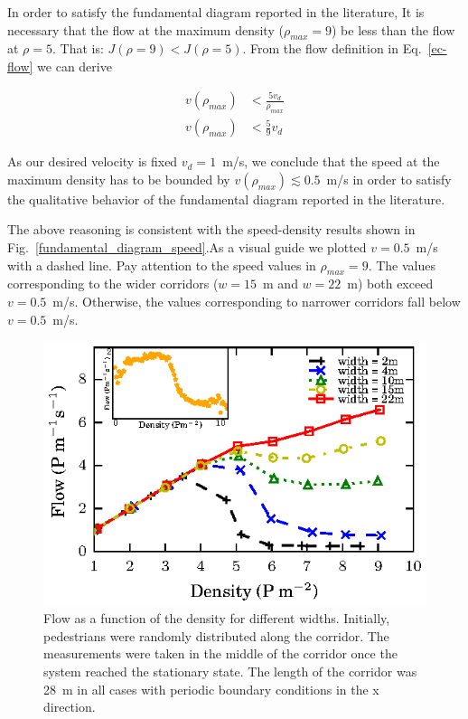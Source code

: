 In order to satisfy the fundamental diagram reported in the literature, It is necessary that the flow at the maximum density ($\rho_{max} = 9$) be less than the flow at $\rho = 5$. That is:  $J(\rho = 9) < J(\rho = 5)$. From the flow definition in Eq.~\ref{ec-flow} we can derive

\begin{align*} 
v(\rho_{max}) &< \frac{5v_d}{\rho_{max}} \\
v(\rho_{max}) &< \frac{5}{9} v_d
\end{align*}

As our desired velocity is fixed $v_d = 1$~m/s, we conclude that the speed at the maximum density has to be bounded by $v(\rho_{max}) \lesssim  0.5$~m/s in order to satisfy the qualitative behavior of the fundamental diagram reported in the literature.

The above reasoning is consistent with the speed-density results shown in Fig.~\ref{fundamental_diagram_speed}.As a visual guide we plotted $v=0.5$~m/s with a dashed line. Pay attention to the speed values in $\rho_{max} = 9$. The values corresponding to the wider corridors ($w=15$~m and $w=22$~m) both exceed $v=0.5$~m/s. Otherwise, the values corresponding to narrower corridors fall below $v=0.5$~m/s. 

\begin{figure}[htbp!]
\includegraphics[width=\columnwidth]
{plots/flow-density_vd1_multiple_widths.eps}
\caption{\label{fundamental_diagram_flow} Flow as a function of the density for different widths. Initially, 
pedestrians were randomly distributed along the corridor. The measurements were taken in the middle
of the corridor once the system reached the stationary state. The length of the corridor 
was 28~m in all cases with periodic boundary conditions in the x direction.}
\end{figure}

